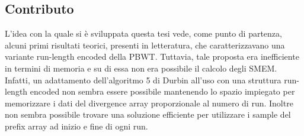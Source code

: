\documentclass[a4paper,11pt, oneside,italian]{article}
\begin{document}
\subsection*{Contributo}
L'idea con la quale si è sviluppata questa tesi vede, come punto di partenza,
alcuni primi risultati teorici, presenti in letteratura, che caratterizzavano
una variante run-length encoded della PBWT. Tuttavia, tale proposta era
inefficiente in termini di memoria e su di essa non era possibile il calcolo
degli SMEM. 
Infatti, un adattamento dell'algoritmo 5 di Durbin all'uso con una struttura
run-length encoded non sembra essere possibile mantenendo lo spazio impiegato
per memorizzare i dati del divergence array proporzionale al numero di 
run. Inoltre non sembra possibile trovare una soluzione efficiente per
utilizzare i sample del prefix array ad inizio e fine di ogni run.
\end{document}
